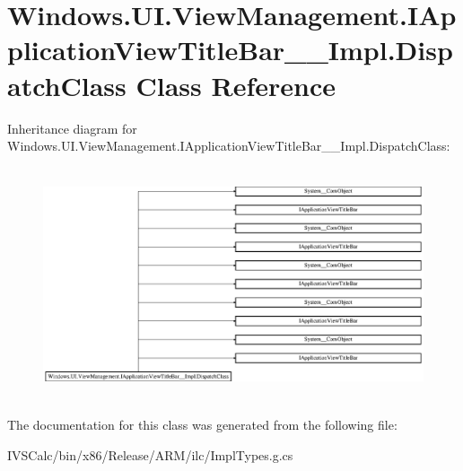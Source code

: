 \hypertarget{class_windows_1_1_u_i_1_1_view_management_1_1_i_application_view_title_bar_____impl_1_1_dispatch_class}{}\section{Windows.\+U\+I.\+View\+Management.\+I\+Application\+View\+Title\+Bar\+\_\+\+\_\+\+Impl.\+Dispatch\+Class Class Reference}
\label{class_windows_1_1_u_i_1_1_view_management_1_1_i_application_view_title_bar_____impl_1_1_dispatch_class}
Inheritance diagram for Windows.\+U\+I.\+View\+Management.\+I\+Application\+View\+Title\+Bar\+\_\+\+\_\+\+Impl.\+Dispatch\+Class\+:\begin{figure}[H]
\begin{center}
\leavevmode
\includegraphics[height=6.844445cm]{class_windows_1_1_u_i_1_1_view_management_1_1_i_application_view_title_bar_____impl_1_1_dispatch_class}
\end{center}
\end{figure}


The documentation for this class was generated from the following file\+:\begin{DoxyCompactItemize}
\item 
I\+V\+S\+Calc/bin/x86/\+Release/\+A\+R\+M/ilc/Impl\+Types.\+g.\+cs\end{DoxyCompactItemize}
